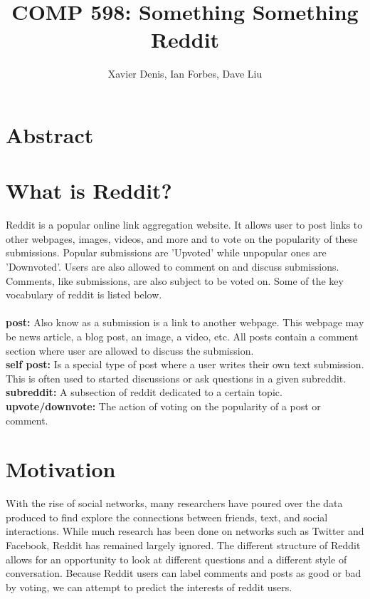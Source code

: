 \documentclass[11pt,twocolumn]{article}
\title {COMP 598: Something Something Reddit}
\author {Xavier Denis, Ian Forbes, Dave Liu}
\begin{document}
\maketitle

\section{Abstract}

\section{What is Reddit?}

Reddit is a popular online link aggregation website. It allows user to post links to other webpages, images, videos, and more and to vote on the popularity of these submissions. Popular submissions are 'Upvoted' while unpopular ones are 'Downvoted'. Users are also allowed to comment on and discuss submissions. Comments, like submissions, are also subject to be voted on. Some of the key vocabulary of reddit is listed below.
\\
\\
\textbf{post:} Also know as a submission is a link to another webpage. This webpage may be news article, a blog post, an image, a video, etc. All posts contain a comment section where user are allowed to discuss the submission.
\\
\textbf{self post:} Is a special type of post where a user writes their own text submission. This is often used to started discussions or ask questions in a given subreddit. 
\\
\textbf{subreddit:} A subsection of reddit dedicated to a certain topic. 
\\
\textbf{upvote/downvote:} The action of voting on the popularity of a post or comment.

\section{Motivation}
With the rise of social networks, many researchers have poured over the data produced to find explore the connections between friends, text, and social interactions. While much research has been done on networks such as Twitter and Facebook, Reddit has remained largely ignored. The different structure of Reddit allows for an opportunity to look at different questions and a different style of conversation. Because Reddit users can label comments and posts as good or bad by voting, we can attempt to predict the interests of reddit users. 
\end{document}
